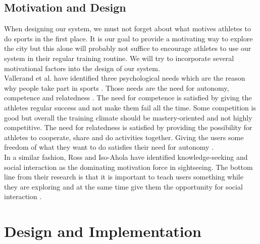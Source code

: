 \documentclass{sigchi}
\begin{document}
\subsection{Motivation and Design}
When designing our system, we must not forget about what motives athletes to do sports in the first place. It is our goal to provide a motivating way to explore the city but this alone will probably not suffice to encourage athletes to use our system in their regular training routine. We will try to incorporate several motivational factors into the design of our system.\\
Vallerand et al. have identified three psychological needs which are the reason why people take part in sports \cite{vallerand2007intrinsic}. Those needs are the need for autonomy, competence and relatedness \cite{vallerand1999integrative}. The need for competence is satisfied by giving the athletes regular success and not make them fail all the time. Some competition is good but overall the training climate should be mastery-oriented and not highly competitive. The need for relatedness is satisfied by providing the possibility for athletes to cooperate, share and do activities together. Giving the users some freedom of what they want to do satisfies their need for autonomy \cite{vallerand2007intrinsic}.\\
In a similar fashion, Ross and Iso-Ahola have identified knowledge-seeking and social interaction as the dominating motivation force in sightseeing. The bottom line from their research is that it is important to teach users something while they are exploring and at the same time give them the opportunity for social interaction \cite{DUNNROSS1991226}.

\section{Design and Implementation}
\end{document}
